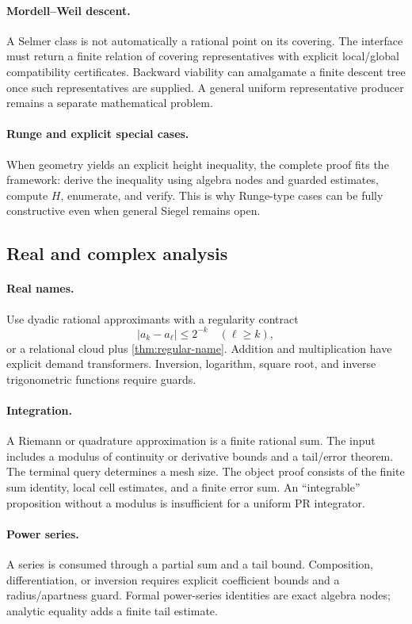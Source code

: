\paragraph{Mordell--Weil descent.}
A Selmer class is not automatically a rational point on its covering.  The interface must return a finite relation of covering representatives with explicit local/global compatibility certificates.  Backward viability can amalgamate a finite descent tree once such representatives are supplied.  A general uniform representative producer remains a separate mathematical problem.

\paragraph{Runge and explicit special cases.}
When geometry yields an explicit height inequality, the complete proof fits the framework: derive the inequality using algebra nodes and guarded estimates, compute \(H\), enumerate, and verify.  This is why Runge-type cases can be fully constructive even when general Siegel remains open.

\subsection{Real and complex analysis}

\paragraph{Real names.}
Use dyadic rational approximants with a regularity contract
\[
 |a_k-a_\ell|\le2^{-k}\quad(\ell\ge k),
\]
or a relational cloud plus \cref{thm:regular-name}.  Addition and multiplication have explicit demand transformers.  Inversion, logarithm, square root, and inverse trigonometric functions require guards.

\paragraph{Integration.}
A Riemann or quadrature approximation is a finite rational sum.  The input includes a modulus of continuity or derivative bounds and a tail/error theorem.  The terminal query determines a mesh size.  The object proof consists of the finite sum identity, local cell estimates, and a finite error sum.  An ``integrable'' proposition without a modulus is insufficient for a uniform PR integrator.

\paragraph{Power series.}
A series is consumed through a partial sum and a tail bound.  Composition, differentiation, or inversion requires explicit coefficient bounds and a radius/apartness guard.  Formal power-series identities are exact algebra nodes; analytic equality adds a finite tail estimate.

